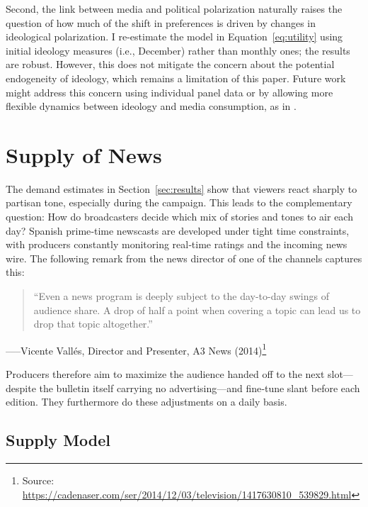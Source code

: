 \documentclass[12pt]{article}
\begin{document}
Second, the link between media and political polarization naturally raises the question of how much of the shift in preferences is driven by changes in ideological polarization. I re-estimate the model in Equation~\ref{eq:utility} using initial ideology measures (i.e., December) rather than monthly ones; the results are robust. However, this does not mitigate the concern about the potential endogeneity of ideology, which remains a limitation of this paper. Future work might address this concern using individual panel data or by allowing more flexible dynamics between ideology and media consumption, as in \cite{martin2017}.

 



\section{Supply of News}


\label{sec:supply}



The demand estimates in Section~\ref{sec:results} show that viewers react sharply to
partisan tone, especially during the campaign.  This  leads to the complementary question:
How do broadcasters decide which mix of stories and tones to air each day? 
Spanish prime‑time newscasts are developed under tight time constraints, with producers
constantly monitoring real‑time ratings and the incoming news wire.  
The following remark from the news director of one of the channels captures this: 


\begin{quote}
	“Even a news program is deeply subject to the day-to-day swings of audience share.  
	A drop of half a point when covering a topic can lead us to drop that topic altogether.”
\end{quote}
\hspace*{\fill}–––Vicente Vallés, Director and Presenter, A3 News (2014)\footnote{Source: \url{https://cadenaser.com/ser/2014/12/03/television/1417630810_539829.html}}

Producers therefore aim to maximize the audience handed off to the next slot—despite the bulletin itself carrying no advertising—and fine‑tune slant before each edition. They furthermore do these adjustments on a daily basis. 

\subsection{Supply Model}
\end{document}
